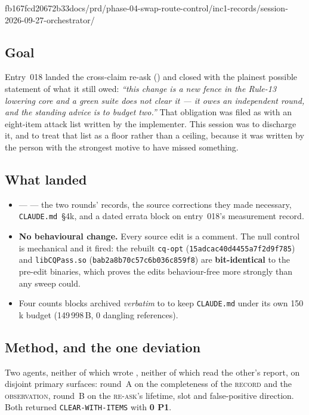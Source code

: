 %
  {fb167fcd}{20672b33}{docs/prd/phase-04-swap-route-control/inc1-records/session-2026-09-27-orchestrator/}

\subsection*{Goal}
Entry~018 landed the cross-claim re-ask () and closed with the
plainest possible statement of what it still owed: \emph{``this change is a new fence in the
Rule-13 lowering core and a green suite does not clear it --- it owes an independent round, and
the standing advice is to budget two.''} That obligation was filed as
 with an eight-item attack list written by the implementer. This
session was to discharge it, and to treat that list as a floor rather than a ceiling, because
it was written by the person with the strongest motive to have missed something.

\subsection*{What landed}
\begin{itemize}
  \item {} ---  --- the two rounds' records, the
        source corrections they made necessary, \texttt{CLAUDE.md}~\S4k, and a dated errata
        block on entry~018's measurement record.
  \item \textbf{No behavioural change.} Every source edit is a comment. The null control is
        mechanical and it fired: the rebuilt \texttt{cq-opt}
        (\texttt{15adcac40d4455a7f2d9f785}) and \texttt{libCQPass.so}
        (\texttt{bab2a8b70c57c6b036c859f8}) are \textbf{bit-identical} to the pre-edit
        binaries, which proves the edits behaviour-free more strongly than any sweep could.
  \item Four counts blocks archived \emph{verbatim} to  to keep
        \texttt{CLAUDE.md} under its own 150\,k budget (149\,998\,B, 0 dangling references).
\end{itemize}

\subsection*{Method, and the one deviation}
Two agents, neither of which wrote , neither of which read the other's report,
on disjoint primary surfaces: round~A on the completeness of the \textsc{record} and the
\textsc{observation}, round~B on the \textsc{re-ask}'s lifetime, slot and false-positive
direction. Both returned \texttt{CLEAR-WITH-ITEMS} with \textbf{0 P1}.

